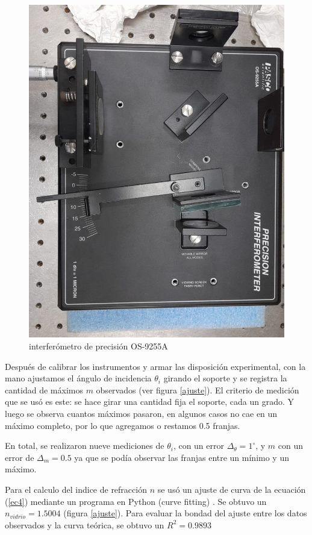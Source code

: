 \documentclass[a4paper, amsfonts, amssymb, amsmath, reprint, showkeys, nofootinbib, twoside]{revtex4-2}
\begin{document}
\begin{figure}[h!]
\centering
\includegraphics[scale=0.3]{img1.jpeg}
\caption{interferómetro de precisión OS-9255A}\label{fig1}
\end{figure}

Después de calibrar los instrumentos y armar las disposición experimental, con la mano ajustamos el ángulo de incidencia $\theta_i$ girando el soporte y se registra la cantidad de máximos $m$ observados (ver figura \ref{ajuste}). El criterio de medición que se usó es este: se hace girar una cantidad fija el soporte, cada un grado. Y luego se observa cuantos máximos pasaron, en algunos casos no cae en un máximo completo, por lo que agregamos o restamos 0.5 franjas.

En total, se realizaron nueve mediciones de $\theta_i$, con un error $\Delta_{\theta} = 1^{\circ}$, y $m$ con un error de $\Delta_m = 0.5$ ya que se podía observar las franjas entre un mínimo y un máximo. 

Para el calculo del indice de refracción $n$ se usó un ajuste de curva de la ecuación (\ref{ec4}) mediante un programa en Python (curve fitting) \cite{code}. Se obtuvo un $n_{vidrio} = 1.5004$ (figura \ref{ajuste}). Para evaluar la bondad del ajuste entre los datos observados y la curva teórica, se obtuvo un $R^2 = 0.9893$
\end{document}
